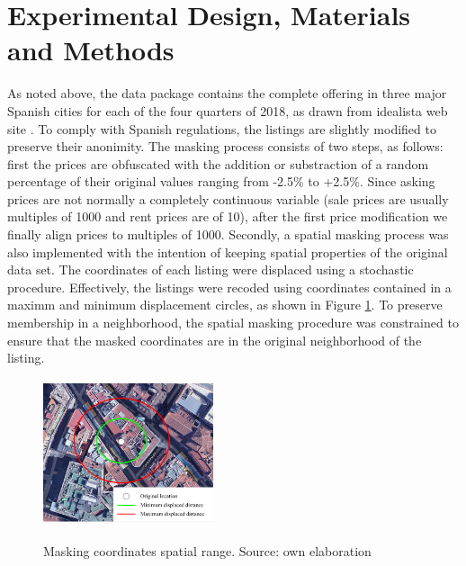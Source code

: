 \documentclass[times,final]{elsarticle}
\begin{document}
\section*{Experimental Design, Materials and Methods}

As noted above, the data package contains the complete offering in three major Spanish cities for each of the four quarters of 2018, as drawn from idealista web site \cite{idealista}. To comply with Spanish regulations, the listings are slightly modified to preserve their anonimity. The masking process consists of two steps, as follows: first the prices are obfuscated with the addition or substraction of a random percentage of their original values ranging from -2.5\% to +2.5\%. Since asking prices are not normally a completely continuous variable (sale prices are usually multiples of 1000 and rent prices are of 10), after the first price modification we finally align prices to multiples of 1000. Secondly, a spatial masking process was also implemented with the intention of keeping spatial properties of the original data set. The coordinates of each listing were displaced using a stochastic procedure. Effectively, the listings were recoded using coordinates contained in a maximm and minimum displacement circles, as shown in Figure \ref{fig:points-moved-image}. To preserve membership in a neighborhood, the spatial masking procedure was constrained to ensure that the masked coordinates are in the original neighborhood of the listing.

\begin{figure}[!ht]
  \caption{Masking coordinates spatial range. Source: own elaboration}
  \centering
  \includegraphics[width=5cm, height=4.3cm]{figures/points-moved-image}
  \label{fig:points-moved-image}
\end{figure}
\end{document}
